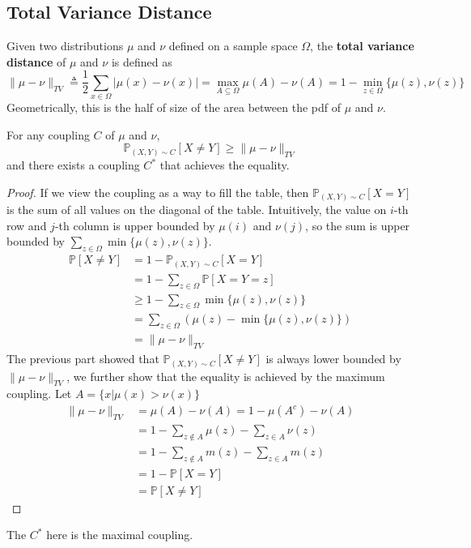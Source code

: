     \subsection{Total Variance Distance}
        \begin{definition}
            Given two distributions $\mu$ and $\nu$ defined on a sample space $\Omega$, the \textbf{total variance distance} of $\mu$ and $\nu$ is defined as
            \[ \|\mu - \nu \|_{TV} \triangleq \frac{1}{2}\sum_{x\in\Omega}|\mu(x)-\nu(x)| = \max_{A\subseteq\Omega} \mu(A)-\nu(A) = 1-\min_{z\in\Omega}\{ \mu(z), \nu(z) \} \]
            Geometrically, this is the half of size of the area between the pdf of $\mu$ and $\nu$.
        \end{definition}
        \begin{lemma}\label{CouplingLemma}
            For any coupling $C$ of $\mu$ and $\nu$,
            \[ \mathbb{P}_{(X,Y)\sim C}[X \neq Y] \ge \|\mu - \nu \|_{TV} \]
            and there exists a coupling $C^{*}$ that achieves the equality.
        \end{lemma}
        \begin{proof}
            If we view the coupling as a way to fill the table, then $\mathbb{P}_{(X,Y) \sim C}[X=Y]$ is the sum of all values on the diagonal of the table. Intuitively, the value on $i$-th row and $j$-th column is upper bounded by $\mu(i)$ and $\nu(j)$, so the sum is upper bounded by $\sum_{z\in\Omega}\min\{\mu(z), \nu(z)\}$.
            \begin{align*}
                \mathbb{P}[X \neq Y] &= 1 - \mathbb{P}_{(X,Y) \sim C}[X = Y] \\
                &= 1 - \sum_{z \in \Omega}\mathbb{P}[X=Y=z] \\
                &\ge 1 - \sum_{z \in \Omega}\min \{\mu(z), \nu(z)\}\\
                &= \sum_{z \in \Omega}\left( \mu(z) - \min\{\mu(z),\nu(z)\} \right)\\
                &= \| \mu - \nu \|_{TV}
            \end{align*}
            The previous part showed that $\mathbb{P}_{(X,Y)\sim C}[X \neq Y]$ is always lower bounded by $\|\mu - \nu\|_{TV}$, we further show that the equality is achieved by the maximum coupling. Let $A = \{x| \mu(x) > \nu(x)\}$
            \begin{align*}
                \|\mu - \nu\|_{TV} &= \mu(A) - \nu(A) = 1 - \mu(A^{c}) - \nu(A)\\
                &= 1 - \sum_{z \notin A}\mu(z) - \sum_{z \in A}\nu(z)\\
                &= 1 - \sum_{z \notin A}m(z) - \sum_{z \in A}m(z)\\
                &= 1 - \mathbb{P}[X=Y]\\
                &= \mathbb{P}[X \neq Y]
            \end{align*}
        \end{proof}
        \begin{remark}
            The $C^*$ here is the maximal coupling.
        \end{remark}



